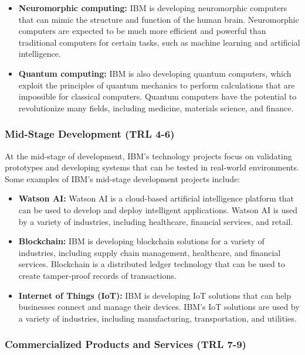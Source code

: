 \begin{itemize}
    \item \textbf{Neuromorphic computing:} IBM is developing neuromorphic computers that can mimic the structure and function of the human brain. Neuromorphic computers are expected to be much more efficient and powerful than traditional computers for certain tasks, such as machine learning and artificial intelligence.
    \item \textbf{Quantum computing:} IBM is also developing quantum computers, which exploit the principles of quantum mechanics to perform calculations that are impossible for classical computers. Quantum computers have the potential to revolutionize many fields, including medicine, materials science, and finance.
\end{itemize}

\subsubsection{Mid-Stage Development (TRL 4-6)}

At the mid-stage of development, IBM's technology projects focus on validating prototypes and developing systems that can be tested in real-world environments. Some examples of IBM's mid-stage development projects include:

\begin{itemize}
    \item \textbf{Watson AI:} Watson AI is a cloud-based artificial intelligence platform that can be used to develop and deploy intelligent applications. Watson AI is used by a variety of industries, including healthcare, financial services, and retail.
    \item \textbf{Blockchain:} IBM is developing blockchain solutions for a variety of industries, including supply chain management, healthcare, and financial services. Blockchain is a distributed ledger technology that can be used to create tamper-proof records of transactions.
    \item \textbf{Internet of Things (IoT):} IBM is developing IoT solutions that can help businesses connect and manage their devices. IBM's IoT solutions are used by a variety of industries, including manufacturing, transportation, and utilities.
\end{itemize}

\subsubsection{Commercialized Products and Services (TRL 7-9)}

